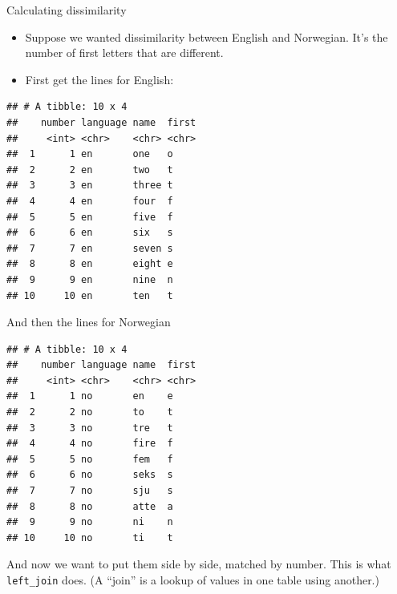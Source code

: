 \documentclass[ignorenonframetext,]{beamer}
\newenvironment{Shaded}{\begin{snugshade}}{\end{snugshade}}
\newcommand{\KeywordTok}[1]{\textcolor[rgb]{0.13,0.29,0.53}{\textbf{#1}}}
\newcommand{\NormalTok}[1]{#1}
\newcommand{\OperatorTok}[1]{\textcolor[rgb]{0.81,0.36,0.00}{\textbf{#1}}}
\newcommand{\StringTok}[1]{\textcolor[rgb]{0.31,0.60,0.02}{#1}}
\begin{document}
\begin{frame}[fragile]{Calculating dissimilarity}
\protect\hypertarget{calculating-dissimilarity}{}

\begin{itemize}
\item
  Suppose we wanted dissimilarity between English and Norwegian. It's
  the number of first letters that are different.
\item
  First get the lines for English:
\end{itemize}

\begin{Shaded}
\end{Shaded}

\begin{verbatim}
## # A tibble: 10 x 4
##    number language name  first
##     <int> <chr>    <chr> <chr>
##  1      1 en       one   o    
##  2      2 en       two   t    
##  3      3 en       three t    
##  4      4 en       four  f    
##  5      5 en       five  f    
##  6      6 en       six   s    
##  7      7 en       seven s    
##  8      8 en       eight e    
##  9      9 en       nine  n    
## 10     10 en       ten   t
\end{verbatim}

\end{frame}

\begin{frame}[fragile]{And then the lines for Norwegian}
\protect\hypertarget{and-then-the-lines-for-norwegian}{}

\begin{Shaded}
\end{Shaded}

\begin{verbatim}
## # A tibble: 10 x 4
##    number language name  first
##     <int> <chr>    <chr> <chr>
##  1      1 no       en    e    
##  2      2 no       to    t    
##  3      3 no       tre   t    
##  4      4 no       fire  f    
##  5      5 no       fem   f    
##  6      6 no       seks  s    
##  7      7 no       sju   s    
##  8      8 no       atte  a    
##  9      9 no       ni    n    
## 10     10 no       ti    t
\end{verbatim}

And now we want to put them side by side, matched by number. This is
what \texttt{left\_join} does. (A ``join'' is a lookup of values in one
table using another.)

\end{frame}
\end{document}
